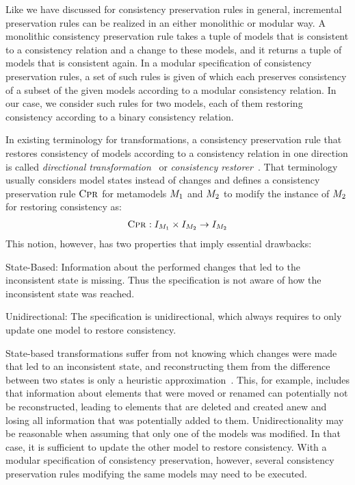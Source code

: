 Like we have discussed for consistency preservation rules in general, incremental preservation rules can be realized in an either monolithic or modular way.
A monolithic consistency preservation rule takes a tuple of models that is consistent to a consistency relation and a change to these models, and it returns a tuple of models that is consistent again.
In a modular specification of consistency preservation rules, a set of such rules is given of which each preserves consistency of a subset of the given models according to a modular consistency relation.
In our case, we consider such rules for two models, each of them restoring consistency according to a binary consistency relation.

In existing terminology for transformations, a consistency preservation rule that restores consistency of models according to a consistency relation in one direction is called \emph{directional transformation}~\cite{stevens2010sosym} or \emph{consistency restorer}~\cite{stevens2020BidirectionalTransformationLarge-SoSym}.
That terminology usually considers model states instead of changes and defines a consistency preservation rule $\textsc{Cpr}_{}$ for metamodels $\metamodel{M}{1}$ and $\metamodel{M}{2}$ to modify the instance of $\metamodel{M}{2}$ for restoring consistency as:
\begin{align*}
    \consistencypreservationrule{}: \metamodelinstanceset{M}{1} \times \metamodelinstanceset{M}{2} \rightarrow \metamodelinstanceset{M}{2}
\end{align*}
This notion, however, has two properties that imply essential drawbacks:
\begin{properdescription}
    \item[State-Based:] Information about the performed changes that led to the inconsistent state is missing. Thus the specification is not aware of how the inconsistent state was reached.
    \item[Unidirectional:] The specification is unidirectional, which always requires to only update one model to restore consistency.
\end{properdescription}
State-based transformations suffer from not knowing which changes were made that led to an inconsistent state, and reconstructing them from the difference between two states is only a heuristic approximation~\cite{diskin2011StateToDeltaSymmetric-MODELS}.
This, for example, includes that information about elements that were moved or renamed can potentially not be reconstructed, leading to elements that are deleted and created anew and losing all information that was potentially added to them.
Unidirectionality may be reasonable when assuming that only one of the models was modified. In that case, it is sufficient to update the other model to restore consistency.
With a modular specification of consistency preservation, however, several consistency preservation rules modifying the same models may need to be executed.

